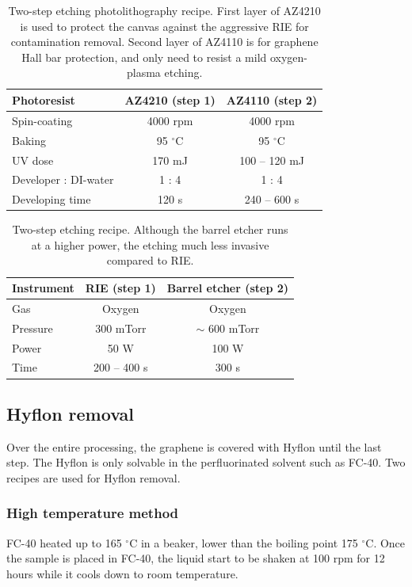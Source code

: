 \documentclass[pdflatex, sectionletters, 12pt]{pittetd}    %
\begin{document}
\begin{table}
	\centering
	\begin{tabular}{l|cc}
		\hline
		Photoresist    & AZ4210 (step 1) & AZ4110 (step 2) \\ \hline
		Spin-coating    &    4000 rpm    &    4000 rpm \\ 
		Baking    &    95 $^{\circ}$C    &    95 $^{\circ}$C    \\ 
		UV dose    &    170 mJ    &    100 -- 120 mJ    \\
		Developer : DI-water    &    1 : 4 &    1 : 4 \\ 
		Developing time    &    120 s    &    240 -- 600 s \\
		\hline
	\end{tabular}
	\caption{Two-step etching photolithography recipe. First layer of AZ4210 is used to protect the canvas against the aggressive RIE for contamination removal. Second layer of AZ4110 is for graphene Hall bar protection, and only need to resist a mild oxygen-plasma etching.}
	\label{TAB:TwoStepPL}
\end{table}

\begin{table}
	\centering
	\begin{tabular}{l|cc}
		\hline
		Instrument    & RIE (step 1)    &    Barrel etcher (step 2) \\ \hline
		Gas    &    Oxygen &    Oxygen \\ 
		Pressure    &    300 mTorr    &    $\sim$ 600 mTorr \\
		Power    &    50 W    &    100 W \\
		Time    &    200 -- 400 s &    300 s\\ \hline
	\end{tabular}
	\caption{Two-step etching recipe. Although the barrel etcher runs at a higher power, the etching much less invasive compared to RIE.}
	\label{TAB:TwoStepEtching}
\end{table}

\subsection{Hyflon removal}

Over the entire processing, the graphene is covered with Hyflon until the last step. The Hyflon is only solvable in the perfluorinated solvent such as FC-40. Two recipes are used for Hyflon removal. 

\subsubsection{High temperature method} FC-40 heated up to 165 $^{\circ}$C in a beaker, lower than the boiling point 175 $^{\circ}$C. Once the sample is placed in FC-40, the liquid start to be shaken at 100 rpm for 12 hours while it cools down to room temperature.
\end{document}
